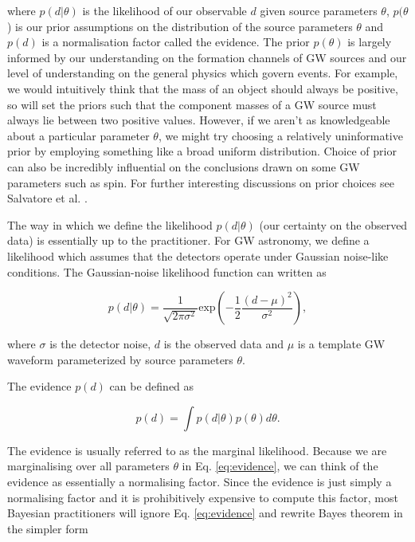 %
%
where $p(d|\theta)$ is the likelihood of our observable $d$ given source parameters $\theta$, $p(\theta$) is our prior assumptions on the distribution of the source parameters $\theta$ and $p(d)$ is a normalisation factor called the evidence. The prior $p(\theta)$ is largely informed by our understanding on the formation channels of \ac{GW} sources and our level of understanding on the general physics which govern events. For example, we would intuitively think that the mass of an object should always be positive, so will set the priors such that the component masses of a \ac{GW} source must always lie between two positive values. However, if we aren't as knowledgeable about a particular parameter $\theta$, we might try choosing a relatively uninformative prior by employing something like a broad uniform distribution. Choice of prior can also be incredibly influential on the conclusions drawn on some \ac{GW} parameters such as spin. For further interesting discussions on prior choices see Salvatore et al. \cite{PhysRevLett.119.251103}.

%
%
The way in which we define the likelihood $p(d|\theta)$ (our certainty on the observed data) is essentially up to the practitioner. For \ac{GW} astronomy, we define a likelihood which assumes that the detectors operate under Gaussian noise-like conditions. The Gaussian-noise likelihood function can written as 

\begin{equation}
    p(d|\theta) = \frac{1}{\sqrt{2\pi \sigma^2}} \textrm{exp}\left(-\frac{1}{2} 
    \frac{(d - \mu)^2}{\sigma^2}\right),
\end{equation}

where $\sigma$ is the detector noise, $d$ is the observed data and $\mu$ is a template \ac{GW} waveform parameterized by source parameters $\theta$. 

%
%
The evidence $p(d)$ can be defined as 

\begin{equation}
    p(d) = \int p(d|\theta) p(\theta) d\theta.
    \label{eq:evidence}
\end{equation}

The evidence is usually referred to as the marginal likelihood. Because we are marginalising over all parameters $\theta$ in Eq. \ref{eq:evidence}, we can think of the evidence as essentially a normalising factor. Since the evidence is just simply a normalising factor and it is prohibitively expensive to compute this factor, most Bayesian practitioners will ignore Eq. \ref{eq:evidence} and rewrite Bayes theorem in the simpler form 

